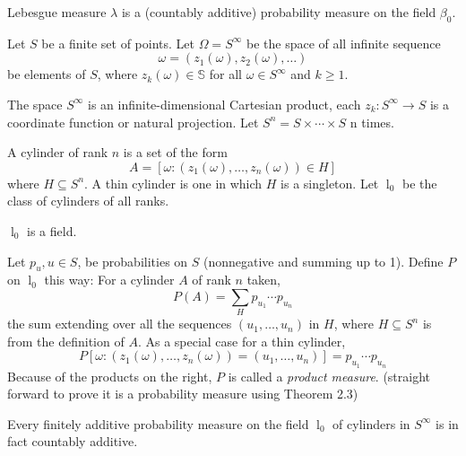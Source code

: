 \documentclass[11pt]{article}
\renewcommand{\S}{\mathbb{S}}
\newcommand{\B}{\beta}
\newcommand{\lc}{\mathop l}
\newcommand{\seq}{\subseteq}
\newcommand{\om}{\omega}
\newcommand{\Om}{\Omega}
\newenvironment{theorem}[2][Theorem]{\begin{trivlist}
\item[\hskip \labelsep {\bfseries #1}\hskip \labelsep {\bfseries #2.}]}{\end{trivlist}}
\newenvironment{definition}[2][Definition]{\begin{trivlist}
\item[\hskip \labelsep {\bfseries #1}\hskip \labelsep {\bfseries #2.}]}{\end{trivlist}}
\newenvironment{rmrk}[2][Remark]{\begin{trivlist}
\item[\hskip \labelsep {\bfseries #1}\hskip \labelsep {\bfseries #2.}]}{\end{trivlist}}
\begin{document}
\begin{theorem}{2.2}
    Lebesgue measure $\lambda$ is a (countably additive) probability measure on the field $\B_0$.
\end{theorem}

\begin{definition}{13}
    Let $S$ be a finite set of points. Let $\Om = S^{\infty}$ be the space of all infinite sequence
    \[ \om = (z_1 (\om), z_2 (\om), \ldots) \]
    be elements of $S$, where $z_k (\om) \in \S$ for all $\om \in S^{\infty}$ and $k \geq 1$.
\end{definition}

\begin{rmrk}{14}
    The space $S^{\infty}$ is an infinite-dimensional Cartesian product, each $z_k: S^{\infty} \to S$ is a coordinate function or natural projection. Let $S^{n} = S \times \cdots \times S$ n times.
\end{rmrk}

\begin{definition}{15}
    A cylinder of rank $n$ is a set of the form
    \[ A = [ \om : (z_1 (\om), \ldots, z_n (\om)) \in H] \]
    where $H \seq S^n$. A thin cylinder is one in which $H$ is a singleton. Let $\lc_0$ be the class of cylinders of all ranks.
\end{definition}

\begin{rmrk}{16}
    $\lc_0$ is a field.
\end{rmrk}


\begin{definition}{17}
    Let $p_u, u \in S$, be probabilities on $S$ (nonnegative and summing up to 1). Define $P$ on $\lc_0$ this way: For a cylinder $A$ of rank $n$ taken,
    \[ P(A) = \sum_{H} p_{u_1} \cdots p_{u_n} \]
    the sum extending over all the sequences $(u_1, \ldots, u_n)$ in $H$, where $H \seq S^n$ is from the definition of $A$. As a special case for a thin cylinder,
    \[ P[\om : (z_1 (\om), \ldots, z_n (\om)) = (u_1, \ldots, u_n)] = p_{u_1} \cdots p_{u_n} \]
    Because of the products on the right, $P$ is called a \emph{product measure}. (straight forward to prove it is a probability measure using Theorem 2.3)
\end{definition}

\begin{theorem}{2.3}
    Every finitely additive probability measure on the field $\lc_0$ of cylinders in $S^{\infty}$ is in fact countably additive.
\end{theorem}
\end{document}
